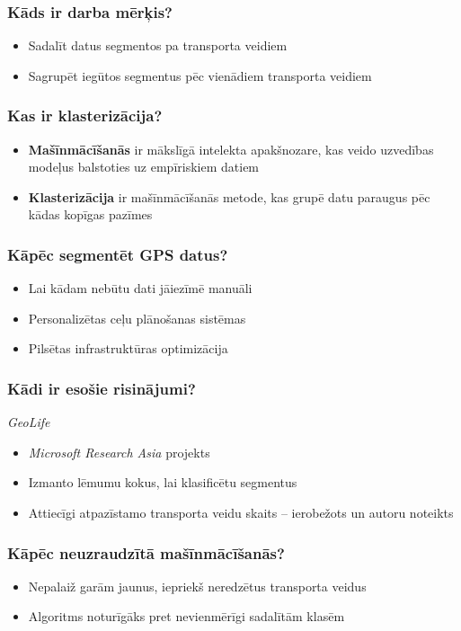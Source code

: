 \documentclass[xelatex,mathserif,serif]{beamer}
\newlength{\wideitemsep}
\let\olditem\item
\renewcommand{\item}{\setlength{\itemsep}{\wideitemsep}\olditem}
\begin{document}
\begin{frame}
  \frametitle{Kāds ir darba mērķis?}
  \begin{itemize}
  \item Sadalīt datus segmentos pa transporta veidiem
  \item Sagrupēt iegūtos segmentus pēc vienādiem transporta veidiem
  \end{itemize}
\end{frame}

\begin{frame}
  \frametitle{Kas ir klasterizācija?}
  \begin{itemize}
    \item \textbf{Mašīnmācīšanās} ir mākslīgā intelekta apakšnozare, kas veido uzvedības modeļus 
      balstoties uz empīriskiem datiem
    \item \textbf{Klasterizācija} ir mašīnmācīšanās metode, kas grupē datu paraugus pēc kādas
      kopīgas pazīmes
  \end{itemize}
\end{frame}

\begin{frame}
  \frametitle{Kāpēc segmentēt GPS datus?}
  \begin{itemize}
    \item Lai kādam nebūtu dati jāiezīmē manuāli
    \item Personalizētas ceļu plānošanas sistēmas
    \item Pilsētas infrastruktūras optimizācija
  \end{itemize}
\end{frame}

\begin{frame}
  \frametitle{Kādi ir esošie risinājumi?}
  \emph{GeoLife}
  \begin{itemize}
    \item \emph{Microsoft Research Asia} projekts
    \item Izmanto lēmumu kokus, lai klasificētu segmentus
    \item Attiecīgi atpazīstamo transporta veidu skaits – ierobežots un autoru noteikts
  \end{itemize}
\end{frame}

\begin{frame}
  \frametitle{Kāpēc neuzraudzītā mašīnmācīšanās?}
  \begin{itemize}
  \item Nepalaiž garām jaunus, iepriekš neredzētus transporta veidus
  \item Algoritms noturīgāks pret nevienmērīgi sadalītām klasēm
  \end{itemize}
\end{frame}
\end{document}
